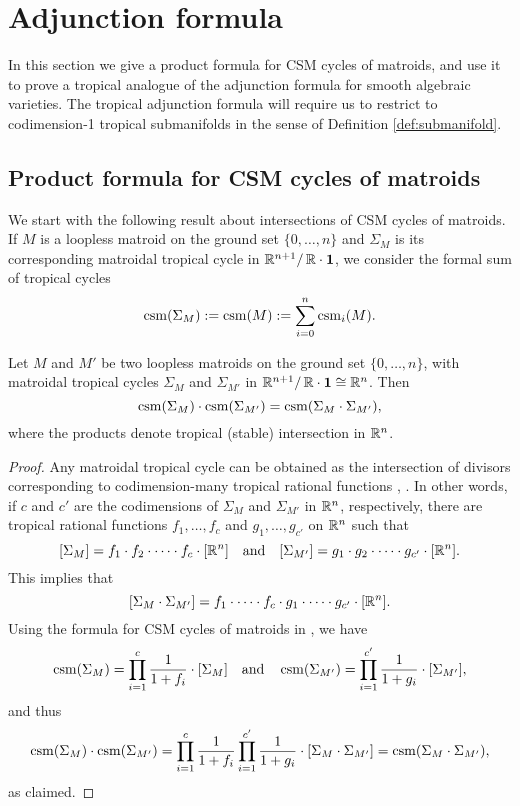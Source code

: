 
 \section{Adjunction formula}\label{sec:adjunction}
 
In this section we give a product formula for CSM cycles of matroids, and use it to prove a tropical analogue of the adjunction formula for smooth algebraic varieties. The tropical adjunction formula will require us to restrict to codimension-1 tropical submanifolds in the sense of Definition \ref{def:submanifold}. 

\subsection{Product formula for CSM cycles of matroids}
We start with the following result about intersections of CSM cycles of matroids. If $M$ is a loopless matroid on the ground set $\{0,\dots,n\}$ and $\Sigma_M$ is its corresponding matroidal tropical cycle in $\mathbb{R}^{n+1} / \, \mathbb R \cdot \mathbf{1}$, we consider the formal sum of tropical cycles
$$\operatorname{csm}(\Sigma_M) := \operatorname{csm}(M) := \sum_{i=0}^n \operatorname{csm}_i(M).$$

\begin{prop}\label{prop:intersectionMatroid}
Let $M$ and $M'$ be two loopless matroids on the ground set $\{0,\dots,n\}$, with matroidal tropical cycles $\Sigma_M$ and $\Sigma_{M'}$ in $\mathbb{R}^{n+1} / \, \mathbb R \cdot \mathbf{1} \cong \mathbb{R}^n$. Then
$$\operatorname{csm}(\Sigma_M) \cdot \operatorname{csm}(\Sigma_{M'})= \operatorname{csm}(\Sigma_{M} \cdot \Sigma_{M'}),$$
where the products denote tropical (stable) intersection in $\mathbb{R}^n$.
\end{prop}

\begin{proof}
Any matroidal tropical cycle can be obtained as the intersection of divisors corresponding to codimension-many tropical rational functions \cite{ShawInt}, \cite[Corollary 3.11]{FrancoisRau}. 
In other words, if $c$ and $c'$ are the codimensions of $\Sigma_M$ and $\Sigma_{M'}$ in $\mathbb{R}^n$, respectively, there are tropical rational functions $f_1, \dots, f_c$ and $g_1, \dots, g_{c'}$ on $\mathbb{R}^n$ such that
$$[\Sigma_M] = f_1 \cdot f_2 \cdot \dots \cdot f_c \cdot [\mathbb{R}^n] \quad \text{and} \quad  [\Sigma_{M'}] = g_1 \cdot g_2 \cdot \dots \cdot g_{c'} \cdot [\mathbb{R}^n].$$
This implies that $$[\Sigma_M \cdot \Sigma_{M'}] = f_1 \cdot \dots \cdot f_c \cdot g_1 \cdot \dots \cdot g_{c'} \cdot [\mathbb{R}^n].$$
Using the formula for CSM cycles of matroids in \cite[Proposition 2.3]{RauHopf},
we have 
$$\operatorname{csm} (\Sigma_M) = \prod_{i = 1}^c \frac{1}{1+ f_i} \cdot [\Sigma_M] \quad \text{and} \quad  \operatorname{csm} (\Sigma_{M'}) = \prod_{i = 1}^{c'} \frac{1}{1+ g_i} \cdot [\Sigma_{M'}],$$
and thus
$$\operatorname{csm} (\Sigma_M) \cdot \operatorname{csm}(\Sigma_{M'}) =  \prod_{i = 1}^c \frac{1}{1+ f_i} \prod_{i = 1}^{c'} \frac{1}{1+ g_i} \cdot [\Sigma_M \cdot \Sigma_{M'}] = \operatorname{csm} (\Sigma_M \cdot \Sigma_{M'}),$$
as claimed.
\end{proof}


